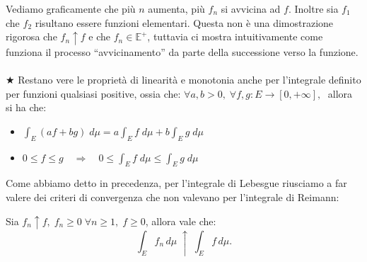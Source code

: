 \begin{figure}[H]
\end{figure}

\noindent Vediamo graficamente che più $n$ aumenta, più $f_n$ si avvicina ad $f$. Inoltre sia $f_1$ che $f_2$ risultano essere funzioni elementari. Questa non è una dimostrazione rigorosa che $f_n\uparrow f$ e che $f_n\in\mathbb{E}^+$, tuttavia ci mostra intuitivamente come funziona il processo ``avvicinamento'' da parte della successione verso la funzione.\\
\\
\(\bigstar\) Restano vere le proprietà di linearità e monotonia anche per l'integrale definito per funzioni qualsiasi positive, ossia che:
$\forall a, b >0, \;\forall f, g:E\to[0, +\infty], \;$ allora si ha che:
\begin{itemize}
    \item \(\int_E(af+bg)\;d\mu = a\int_Ef\;d\mu + b\int_E g\;d\mu\)
    \item \(0\leq f\leq g\quad \Rightarrow\quad 0\leq\int_Ef\;d\mu\leq\int_Eg\;d\mu\)
\end{itemize}

\noindent Come abbiamo detto in precedenza, per l'integrale di Lebesgue riusciamo a far valere dei criteri di convergenza che non valevano per l'integrale di Reimann:
\begin{teorema}
    Sia $f_n\uparrow f, \; f_n\geq 0\;\forall n\geq1, \; f\geq0$, allora vale che:
    \[
    \int_E f_n\,d\mu \;\uparrow\; \int_E f\,d\mu.
    \]
\end{teorema}

